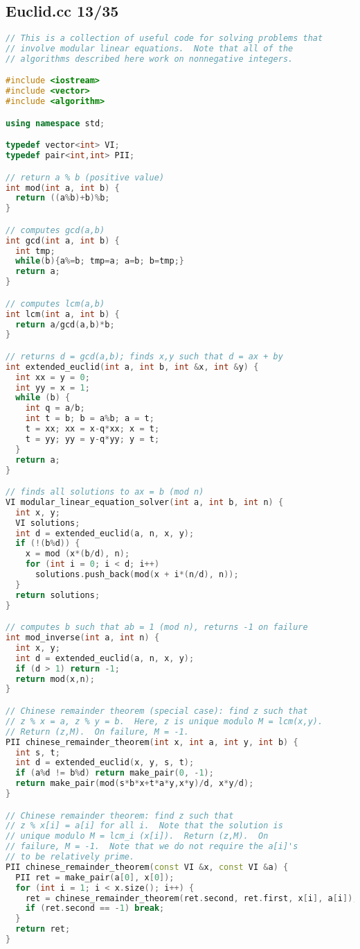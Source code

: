 \subsection{Euclid.cc 13/35}
\begin{lstlisting}[language=C++]
// This is a collection of useful code for solving problems that
// involve modular linear equations.  Note that all of the
// algorithms described here work on nonnegative integers.

#include <iostream>
#include <vector>
#include <algorithm>

using namespace std;

typedef vector<int> VI;
typedef pair<int,int> PII;

// return a % b (positive value)
int mod(int a, int b) {
  return ((a%b)+b)%b;
}

// computes gcd(a,b)
int gcd(int a, int b) {
  int tmp;
  while(b){a%=b; tmp=a; a=b; b=tmp;}
  return a;
}

// computes lcm(a,b)
int lcm(int a, int b) {
  return a/gcd(a,b)*b;
}

// returns d = gcd(a,b); finds x,y such that d = ax + by
int extended_euclid(int a, int b, int &x, int &y) {  
  int xx = y = 0;
  int yy = x = 1;
  while (b) {
    int q = a/b;
    int t = b; b = a%b; a = t;
    t = xx; xx = x-q*xx; x = t;
    t = yy; yy = y-q*yy; y = t;
  }
  return a;
}

// finds all solutions to ax = b (mod n)
VI modular_linear_equation_solver(int a, int b, int n) {
  int x, y;
  VI solutions;
  int d = extended_euclid(a, n, x, y);
  if (!(b%d)) {
    x = mod (x*(b/d), n);
    for (int i = 0; i < d; i++)
      solutions.push_back(mod(x + i*(n/d), n));
  }
  return solutions;
}

// computes b such that ab = 1 (mod n), returns -1 on failure
int mod_inverse(int a, int n) {
  int x, y;
  int d = extended_euclid(a, n, x, y);
  if (d > 1) return -1;
  return mod(x,n);
}

// Chinese remainder theorem (special case): find z such that
// z % x = a, z % y = b.  Here, z is unique modulo M = lcm(x,y).
// Return (z,M).  On failure, M = -1.
PII chinese_remainder_theorem(int x, int a, int y, int b) {
  int s, t;
  int d = extended_euclid(x, y, s, t);
  if (a%d != b%d) return make_pair(0, -1);
  return make_pair(mod(s*b*x+t*a*y,x*y)/d, x*y/d);
}

// Chinese remainder theorem: find z such that
// z % x[i] = a[i] for all i.  Note that the solution is
// unique modulo M = lcm_i (x[i]).  Return (z,M).  On 
// failure, M = -1.  Note that we do not require the a[i]'s
// to be relatively prime.
PII chinese_remainder_theorem(const VI &x, const VI &a) {
  PII ret = make_pair(a[0], x[0]);
  for (int i = 1; i < x.size(); i++) {
    ret = chinese_remainder_theorem(ret.second, ret.first, x[i], a[i]);
    if (ret.second == -1) break;
  }
  return ret;
}


\end{lstlisting}
